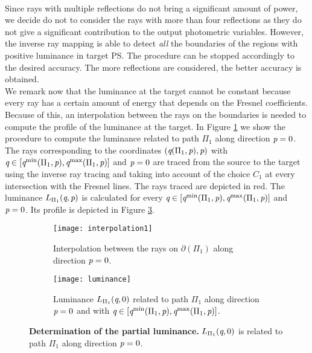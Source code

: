 \\ \indent Since rays with multiple reflections do not bring a significant amount of power, we decide do not to consider the rays with more than four reflections as they do not give a significant contribution to the output photometric variables. However, the inverse ray mapping is able to detect \textit{all} the boundaries of the regions with positive luminance in target PS. The procedure can be stopped accordingly to the desired accuracy. The more reflections are considered, the better accuracy is obtained. \\ \indent
We remark now that the luminance at the target cannot be constant because every ray has a certain amount of energy that depends on the Fresnel coefficients. Because of this, an interpolation between the rays on the boundaries is needed to compute the profile of the luminance at the target. In Figure \ref{fig:interpolation1} we show the procedure to compute the luminance related to path $\Pi_1$ along direction $\textit{p}=0$. The rays corresponding to the coordinates $(\textit{q}(\Pi_1, \textit{p}), \textit{p})$ with $\textit{q}\in[\textit{q}^{\textrm{min}}(\Pi_1,\textit{p}), \textit{q}^{\textrm{max}}(\Pi_1,\textit{p})]$ and $\textit{p}=0$ are traced from the source to the target using the inverse ray tracing and taking into account of the choice $C_1$ at every intersection with the Fresnel lines. The rays traced are depicted in red. The luminance $L_{\Pi_1}(\textit{q}, \textit{p})$ is calculated for every $\textit{q}\in[\textit{q}^{\textrm{min}}(\Pi_1,\textit{p}), \textit{q}^{\textrm{max}}(\Pi_1,\textit{p})]$ and $\textit{p}=0$. Its profile is depicted in Figure \ref{fig:luminance_fresnel}.
\begin{figure}[t]
\centering
\begin{subfigure}{.45\textwidth}
  \texttt{[image: interpolation1]}
 \caption{Interpolation between the rays on $\partial$$(\Pi_1)$ along direction $\textit{p}=0$.}
  \label{fig:interpolation1}
\end{subfigure}%
\hfill
\begin{subfigure}{.45\textwidth}
  \texttt{[image: luminance]}
  \caption{Luminance $L_{\Pi_1}(\textit{q}, 0)$ related to path $\Pi_1$ along direction $\textit{p}=0$ and with $\textit{q}\in[\textit{q}^{\textrm{min}}(\Pi_1, \textit{p}), \textit{q}^{\textrm{max}}(\Pi_1, \textit{p})]$.} %
  \label{fig:luminance_fresnel}
\end{subfigure} %
\caption{\textbf{Determination of the partial luminance.} $L_{\Pi_1}(\textit{q}, 0)$ is related to path $\Pi_1$ along direction $\textit{p}=0$.} 
\end{figure}
